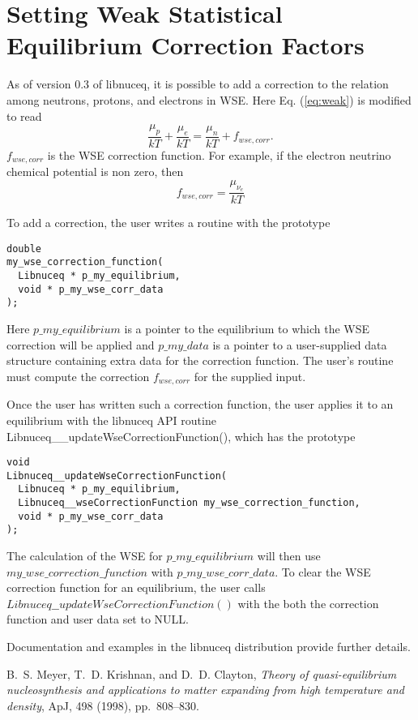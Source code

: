 \documentclass{article}    %
\newcommand{\apj}{ApJ}
\begin{document}
\section{Setting Weak Statistical Equilibrium Correction Factors}

As of version 0.3 of libnuceq, it is possible to add a correction to the
relation among neutrons, protons, and electrons in WSE.
Here Eq. (\ref{eq:weak}) is modified to read
\begin{equation}
\frac{\mu_p}{kT} + \frac{\mu_e}{kT} = \frac{\mu_n}{kT} + f_{wse,corr}.
\label{eq:weak_modified}
\end{equation}
$f_{wse,corr}$ is the WSE correction function.  For example, if the
electron neutrino chemical potential is non zero, then
\begin{equation}
f_{wse,corr} = \frac{\mu_{\nu_e}}{kT}
\label{eq:mu_nue}
\end{equation}

To add a correction, the user writes a routine with the prototype
\begin{verbatim}
double
my_wse_correction_function(
  Libnuceq * p_my_equilibrium,
  void * p_my_wse_corr_data
);
\end{verbatim}
Here $p\_my\_equilibrium$ is a pointer to the equilibrium to which the
WSE correction will be applied and $p\_my\_data$ is a pointer to a
user-supplied data structure containing extra data for the correction
function.  The user's routine must compute the correction $f_{wse,corr}$
for the supplied input.

Once the user has written such a correction function, the user applies
it to an equilibrium with the libnuceq API routine
Libnuceq\_\_updateWseCorrectionFunction(), which has the prototype
\begin{verbatim}
void
Libnuceq__updateWseCorrectionFunction(
  Libnuceq * p_my_equilibrium,
  Libnuceq__wseCorrectionFunction my_wse_correction_function,
  void * p_my_wse_corr_data
);
\end{verbatim}
The calculation of the WSE for $p\_my\_equilibrium$ will then use
$my\_wse\_correction\_function$ with $p\_my\_wse\_corr\_data$.  To
clear the WSE correction function for an equilibrium, the user calls
$Libnuceq\_\_updateWseCorrectionFunction()$ with the both
the correction function and user data set to NULL.

Documentation and examples in the libnuceq distribution provide further
details.

\begin{thebibliography}{1}

{\sc B.~S. {Meyer}, T.~D. {Krishnan}, and D.~D. {Clayton}}, {\em Theory of
  quasi-equilibrium nucleosynthesis and applications to matter expanding from
  high temperature and density}, \apj, 498 (1998), pp.~808--830.

\end{thebibliography}
\end{document}
